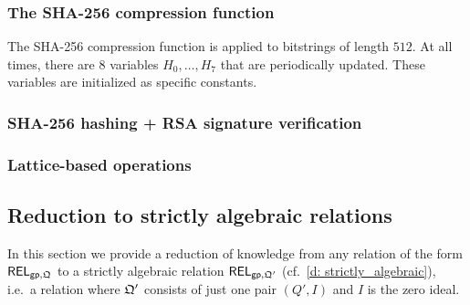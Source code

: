 \documentclass[11pt,letterpaper,usenames,dvipsnames]{article}
\begin{document}
\subsubsection{The SHA-256 compression function}

The SHA-256 compression function is applied to bitstrings of length $512$. At all times, there are $8$ variables $H_0,\ldots, H_7$ that are periodically updated.  These variables are initialized as specific constants.




\subsubsection{SHA-256 hashing + RSA signature verification}

\subsubsection{Lattice-based operations}


\subsection{Reduction to strictly algebraic relations}

 In this section we provide a reduction of knowledge from  any relation of the form $\mathsf{REL}_{\mathsf{gp}, \mathfrak{Q}}$ to a strictly algebraic relation $\mathsf{REL}_{\mathsf{gp}, \mathfrak{Q}'}$ (cf.\ \cref{d: strictly_algebraic}), i.e.\ a relation where  $\mathfrak{Q}'$ consists of just one pair $(Q', I)$ and $I$ is the zero  ideal. 
\end{document}
